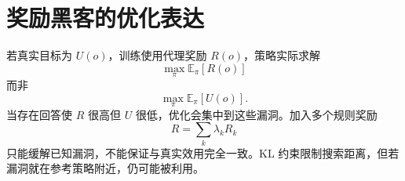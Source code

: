 \documentclass[UTF8,12pt,a4paper,fontset=none]{ctexart}
\numberwithin{equation}{section}
\newcommand{\E}{\mathbb{E}}
\begin{document}
\section{奖励黑客的优化表达}
若真实目标为 $U(o)$，训练使用代理奖励 $R(o)$，策略实际求解
\begin{equation}
 \max_\pi\E_\pi[R(o)]
\end{equation}
而非
\begin{equation}
 \max_\pi\E_\pi[U(o)].
\end{equation}
当存在回答使 $R$ 很高但 $U$ 很低，优化会集中到这些漏洞。加入多个规则奖励
\begin{equation}
 R=\sum_k\lambda_kR_k
\end{equation}
只能缓解已知漏洞，不能保证与真实效用完全一致。KL 约束限制搜索距离，但若漏洞就在参考策略附近，仍可能被利用。
\end{document}
